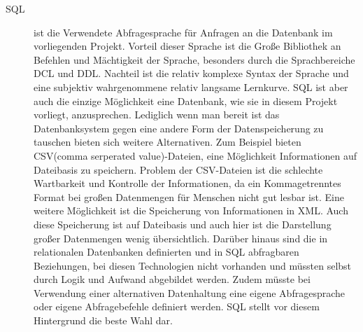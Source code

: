 \begin{description}
  \item[SQL] ist die Verwendete Abfragesprache für Anfragen an die Datenbank im vorliegenden Projekt. Vorteil dieser Sprache ist die Große Bibliothek an Befehlen und Mächtigkeit der Sprache, besonders durch die Sprachbereiche DCL und DDL. Nachteil ist die relativ komplexe Syntax der Sprache und eine subjektiv wahrgenommene relativ langsame Lernkurve. SQL ist aber auch die einzige Möglichkeit eine Datenbank, wie sie in diesem Projekt vorliegt, anzusprechen. Lediglich wenn man bereit ist das Datenbanksystem gegen eine andere Form der Datenspeicherung zu tauschen bieten sich weitere Alternativen. Zum Beispiel bieten CSV(comma serperated value)-Dateien, eine Möglichkeit Informationen auf Dateibasis zu speichern. Problem der CSV-Dateien ist die schlechte Wartbarkeit und Kontrolle der Informationen, da ein Kommagetrenntes Format bei großen Datenmengen für Menschen nicht gut lesbar ist. Eine weitere Möglichkeit ist die Speicherung von Informationen in XML. Auch diese Speicherung ist auf Dateibasis und auch hier ist die Darstellung großer Datenmengen wenig übersichtlich. Darüber hinaus sind die in relationalen Datenbanken definierten und in SQL abfragbaren Beziehungen, bei diesen Technologien nicht vorhanden und müssten selbst durch Logik und Aufwand abgebildet werden. Zudem müsste bei Verwendung einer alternativen Datenhaltung eine eigene Abfragesprache oder eigene Abfragebefehle definiert werden. SQL stellt vor diesem Hintergrund die beste Wahl dar.
\end{description}